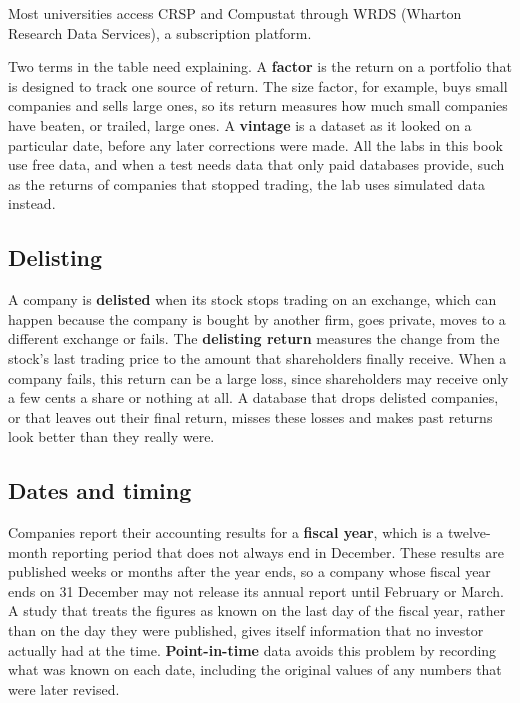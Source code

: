 Most universities access CRSP and Compustat through WRDS (Wharton Research Data Services), a subscription platform.

Two terms in the table need explaining. A \textbf{factor} is the return on a portfolio that is designed to track one source of return. The size factor, for example, buys small companies and sells large ones, so its return measures how much small companies have beaten, or trailed, large ones. A \textbf{vintage} is a dataset as it looked on a particular date, before any later corrections were made. All the labs in this book use free data, and when a test needs data that only paid databases provide, such as the returns of companies that stopped trading, the lab uses simulated data instead.

\subsection{Delisting}

A company is \textbf{delisted} when its stock stops trading on an exchange, which can happen because the company is bought by another firm, goes private, moves to a different exchange or fails. The \textbf{delisting return} measures the change from the stock's last trading price to the amount that shareholders finally receive. When a company fails, this return can be a large loss, since shareholders may receive only a few cents a share or nothing at all. A database that drops delisted companies, or that leaves out their final return, misses these losses and makes past returns look better than they really were.


\subsection{Dates and timing}

Companies report their accounting results for a \textbf{fiscal year}, which is a twelve-month reporting period that does not always end in December. These results are published weeks or months after the year ends, so a company whose fiscal year ends on 31 December may not release its annual report until February or March. A study that treats the figures as known on the last day of the fiscal year, rather than on the day they were published, gives itself information that no investor actually had at the time. \textbf{Point-in-time} data avoids this problem by recording what was known on each date, including the original values of any numbers that were later revised.

